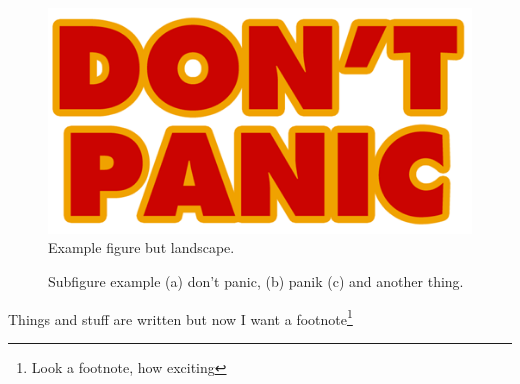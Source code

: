 \begin{landscape}
	\begin{figure} 
		\centering    
		\includegraphics[width=1.2\textwidth]{Chapter1/Figs/dont-panic.png}
		\caption[This bit of text goes in the list of figures so might be slightly different.]{Example figure but landscape.}
		\label{fig:exoflow}
	\end{figure}
\end{landscape}


\begin{figure}
	\centering    
	\caption[Subfigure example (a) don't panic, (b) panik (c) and another thing.]{Subfigure example (a) don't panic, (b) panik (c) and another thing.}
	\label{fig:FractureProne} %
\end{figure}

Things and stuff are written but now I want a footnote\footnote{Look a footnote, how exciting}


